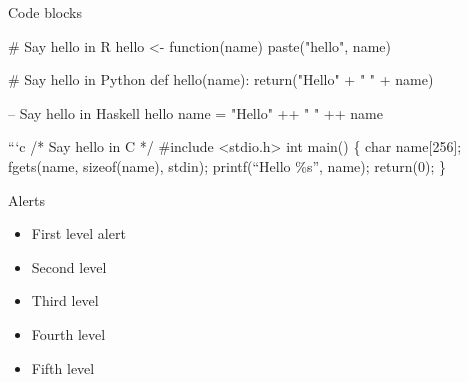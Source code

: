 \documentclass[12pt,ignorenonframetext,compress]{beamer}
\newenvironment{Shaded}{}{}
\newcommand{\CommentTok}[1]{\textcolor[rgb]{0.00,0.50,0.00}{#1}}
\newcommand{\ControlFlowTok}[1]{\textcolor[rgb]{0.00,0.00,1.00}{#1}}
\newcommand{\FunctionTok}[1]{#1}
\newcommand{\KeywordTok}[1]{\textcolor[rgb]{0.00,0.00,1.00}{#1}}
\newcommand{\NormalTok}[1]{#1}
\newcommand{\OperatorTok}[1]{#1}
\newcommand{\StringTok}[1]{\textcolor[rgb]{0.00,0.50,0.50}{#1}}
\providecommand{\tightlist}{%
  \setlength{\itemsep}{0pt}\setlength{\parskip}{0pt}}
\begin{document}
\begin{frame}[fragile]{Code blocks}
\protect\hypertarget{code-blocks}{}

\footnotesize

\begin{Shaded}
\begin{Highlighting}[]
\CommentTok{# Say hello in R}
\NormalTok{hello <-}\StringTok{ }\ControlFlowTok{function}\NormalTok{(name) }\KeywordTok{paste}\NormalTok{(}\StringTok{"hello"}\NormalTok{, name)}
\end{Highlighting}
\end{Shaded}

\begin{Shaded}
\begin{Highlighting}[]
\CommentTok{# Say hello in Python}
\KeywordTok{def}\NormalTok{ hello(name):}
\ControlFlowTok{return}\NormalTok{(}\StringTok{"Hello"} \OperatorTok{+} \StringTok{" "} \OperatorTok{+}\NormalTok{ name)}
\end{Highlighting}
\end{Shaded}

\begin{Shaded}
\begin{Highlighting}[]
\CommentTok{-- Say hello in Haskell}
\NormalTok{hello name }\FunctionTok{=} \StringTok{"Hello"} \FunctionTok{++} \StringTok{" "} \FunctionTok{++}\NormalTok{ name}
\end{Highlighting}
\end{Shaded}

```c /* Say hello in C */ \#include \textless{}stdio.h\textgreater{} int
main() \{ char name{[}256{]}; fgets(name, sizeof(name), stdin);
printf(``Hello \%s'', name); return(0); \}

\normalsize

\end{frame}

\begin{frame}{Alerts}
\protect\hypertarget{alerts}{}

\begin{itemize}
\tightlist
\item
  First level \alert{alert}
\item
  Second level 
\item
  Third level 
\item
  Fourth level 
\item
  Fifth level 
\end{itemize}

\end{frame}
\end{document}
